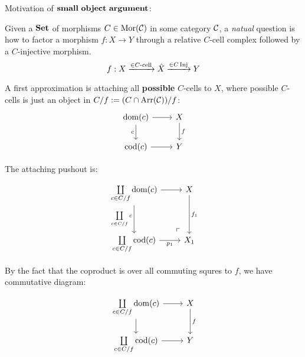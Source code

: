         \begin{intro}
            Motivation of $\mbf{small\ object\ argument}$:
            \par Given a $\mathbf{Set}$ of morphisms $C \in \operatorname{\rm{Mor}}(\mathcal{C})$ in some category $\mathcal{C}$,
            a \emph{natual} question is how to factor a morphism $f : X \to Y$ through a relative $C$-cell complex followed by a $C$-injective morphism.
            $$ f : X \xrightarrow{\in C \text{-cell}}  \hat{X} \xrightarrow{\in C \operatorname{\rm{Inj}}} Y $$

            \par A first approximation is attaching all \textbf{possible} $C$-cells to $X$,
            where possible $C$-cells is just an object in $C/f := (C \cap \operatorname{\rm{Arr}}(\mathcal{C}))/f$:
            \[\begin{tikzcd}
                {\dom(c)} & X \\
                {\cod(c)} & Y
                \arrow["c"', from=1-1, to=2-1]
                \arrow[from=1-1, to=1-2]
                \arrow[from=2-1, to=2-2]
                \arrow["f", from=1-2, to=2-2]
            \end{tikzcd}\]
            
            \par The attaching pushout is:

            \[\begin{tikzcd}[row sep = 1.2cm]
                {\coprod\limits_{c \in C/f} \dom(c)} & X \\
                {\coprod\limits_{c\in C/f} \cod(c)} & X_1
                \arrow["{\coprod\limits_{c\in C/f} c}"', from=1-1, to=2-1]
                \arrow[from=1-1, to=1-2]
                \arrow["p_1"', from=2-1, to=2-2]
                \arrow["f_1", from=1-2, to=2-2]
                \arrow["{\Big \lrcorner}"{anchor=center, pos=0.125, rotate=180}, draw=none, from=2-2, to=1-1]
            \end{tikzcd}\]

            \par By the fact that the coproduct is over all commuting squres to $f$,
            we have commutative diagram:

            \[\begin{tikzcd}
                {{\coprod\limits_{c\in C/f} \dom(c)}} & X \\
                {{\coprod\limits_{c\in C/f} \cod(c)}} & Y
                \arrow[from=1-1, to=2-1]
                \arrow[from=2-1, to=2-2]
                \arrow[from=1-1, to=1-2]
                \arrow["f", from=1-2, to=2-2]
            \end{tikzcd}\]


\end{intro}
